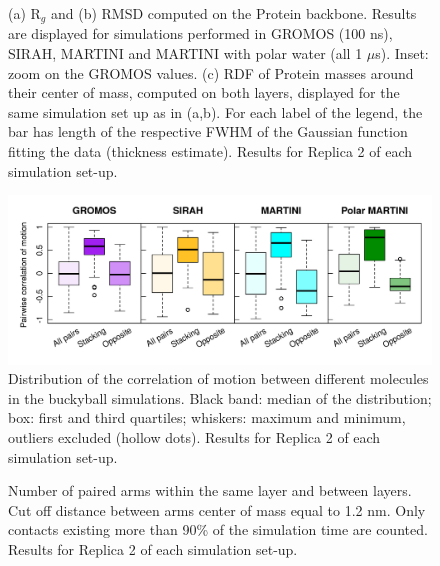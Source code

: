 \begin{figure}[h!]
\caption[Replica 2: Structural measures on buckyball in solution]{(a) R$_g$ and (b) RMSD computed on the Protein backbone. Results are displayed for simulations performed in GROMOS (100 ns), SIRAH, MARTINI and MARTINI with polar water (all 1 $\mu$s). Inset: zoom on the GROMOS values. (c) RDF of Protein masses around their center of mass, computed on both layers, displayed for the same simulation set up as in (a,b). For each label of the legend, the bar has length of the respective FWHM of the Gaussian function fitting the data (thickness estimate). Results for Replica 2 of each simulation set-up.}
\label{fig:struct_UA_SIhere2}
\end{figure}

\begin{figure}[t]
\centering
\includegraphics[width=0.95\linewidth]{3results_capsule/pics/R2_RKGBcorr_boxplot_all.png} 
\caption[Replica 2: Correlation of motion between molecules of the buckyball]{Distribution of the correlation of motion between different molecules in the buckyball simulations. Black band: median of the distribution; box: first and third quartiles; whiskers: maximum and minimum, outliers excluded (hollow dots). Results for Replica 2 of each simulation set-up.}
\label{fig:BTI_corr2}
\end{figure}

\begin{figure}[t!]
\centering
\caption[Replica 2: Arm pairing during simulations of the buckyball]{Number of paired arms within the same layer and between layers. Cut off distance between arms center of mass equal to 1.2 nm. Only contacts existing more than 90\% of the simulation time are counted. Results for Replica 2 of each simulation set-up.}
\label{fig:BTI_beta2}
\end{figure}

